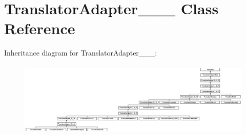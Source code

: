 \hypertarget{class_translator_adapter__1__8__2}{}\section{Translator\+Adapter\+\_\+\_\+\_ Class Reference}
\label{class_translator_adapter__1__8__2}
Inheritance diagram for Translator\+Adapter\+\_\+\_\+\_\+:\begin{figure}[H]
\begin{center}
\leavevmode
\includegraphics[height=3.572567cm]{class_translator_adapter__1__8__2}
\end{center}
\end{figure}
